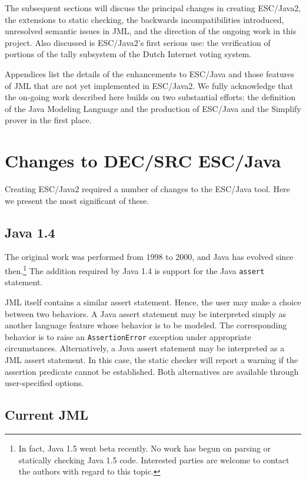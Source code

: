 \documentclass{llncs}
\begin{document}
The subsequent sections will discuss the principal changes in creating
ESC/Java2, the extensions to static checking, the backwards
incompatibilities introduced, unresolved semantic issues in JML, and
the direction of the ongoing work in this project.  Also discussed is
ESC/Java2's first serious use: the verification of portions of the
tally subsystem of the Dutch Internet voting system.

Appendices list the details of the enhancements to ESC/Java and those
features of JML that are not yet implemented in ESC/Java2.  We fully
acknowledge that the on-going work described here builds on two
substantial efforts: the definition of the Java Modeling Language and
the production of ESC/Java and the Simplify prover in the first place.

\section{Changes to DEC/SRC ESC/Java}

Creating ESC/Java2 required a number of changes to the ESC/Java tool.
Here we present the most significant of these.

\subsection{Java 1.4}

The original work was performed from 1998 to 2000, and Java has
evolved since then.\footnote{In fact, Java 1.5 went beta recently.  No
  work has begun on parsing or statically checking Java 1.5 code.
  Interested parties are welcome to contact the authors with regard to
  this topic.}  The addition required by Java 1.4 is support for the
Java {\tt assert} statement.

JML itself contains a similar assert statement.  Hence, the user may
make a choice between two behaviors.  A Java assert statement may be
interpreted simply as another language feature whose behavior is to be
modeled.  The corresponding behavior is to raise an
\texttt{AssertionError} exception under appropriate circumstances.
Alternatively, a Java assert statement may be interpreted as a JML
assert statement.  In this case, the static checker will report a
warning if the assertion predicate cannot be established.  Both
alternatives are available through user-specified options.

\subsection{Current JML}
\end{document}
